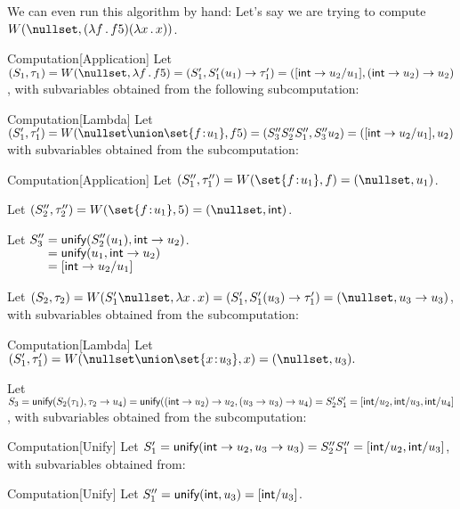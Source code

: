 \documentclass[class=scrartcl]{standalone}
\begin{document}
\begin{example}
  We can even run this algorithm by hand:
  Let's say we are trying to compute
  \(W(\nullset, (\plambda{f}{f 5})(\plambda{x}{x}))\).
  \begin{adhoctheorem*}{Computation}[Application]
    Let \((S_1, \tau_1) = W(\nullset, \plambda{f}{f 5})
                        = (S_1', S_1'(u_1) \to \tau_1')
                        = ([\pint \to u_2 / u_1], (\pint \to u_2) \to u_2)\),
    with subvariables obtained from the following subcomputation:
    \begin{adhoctheorem*}{Computation}[Lambda]
      Let \((S_1', \tau_1') = W(\nullset \union \set{f \of u_1}, f 5)
                            = (S_3'' S_2'' S_1'', S_3'' u_2)
                            = ([\pint \to u_2 / u_1], u_2)\)
      with subvariables obtained from the subcomputation:
      \begin{adhoctheorem*}{Computation}[Application]
        Let \((S_1'', \tau_1'') = W(\set{f \of u_1}, f) = (\nullset, u_1)\).

        Let \((S_2'', \tau_2'') = W(\set{f \of u_1}, 5) = (\nullset, \pint)\).

        Let \(\begin{aligned}[t]
            S_3'' &= \operatorname{\textsf{unify}}(S_2''(u_1), \textsf{int} \to u_2) \\[-1ex]
                  &= \operatorname{\textsf{unify}}(u_1, \textsf{int} \to u_2) \\[-1ex]
                  &= [\textsf{int} \to u_2 / u_1]
          \end{aligned}\).
      \end{adhoctheorem*}
    \end{adhoctheorem*}

    Let \((S_2, \tau_2) = W(S_1' \nullset, \plambda{x}{x})
                        = (S_1', S_1'(u_3) \to \tau_1')
                        = (\nullset, u_3 \to u_3)\),
    with subvariables obtained from the subcomputation:
    \begin{adhoctheorem*}{Computation}[Lambda]
      Let \((S_1', \tau_1') = W(\nullset \union \set{x \of u_3}, x)
                            = (\nullset, u_3).\)
    \end{adhoctheorem*}

    Let \(S_3 = \operatorname{\textsf{unify}}(S_2(\tau_1), \tau_2 \to u_4)
              = \operatorname{\textsf{unify}}((\textsf{int} \to u_2) \to u_2, (u_3 \to u_3) \to u_4)
              = S_2' S_1'
              = [ \textsf{int} / u_2
                , \textsf{int} / u_3
                , \textsf{int} / u_4
                ]\),
    with subvariables obtained from the subcomputation:
    \begin{adhoctheorem*}{Computation}[Unify]
      Let \(S_1' = \operatorname{\textsf{unify}}(\textsf{int} \to u_2, u_3 \to u_3)
                 = S_2'' S_1''
                 = [ \textsf{int} / u_2
                   , \textsf{int} / u_3
                   ]\),
      with subvariables obtained from:
      \begin{adhoctheorem*}{Computation}[Unify]
        Let \(S_1'' = \operatorname{\textsf{unify}}(\textsf{int}, u_3)
                    = [\textsf{int} / u_3]\).


\end{adhoctheorem*}
\end{adhoctheorem*}
\end{adhoctheorem*}
\end{example}
\end{document}
